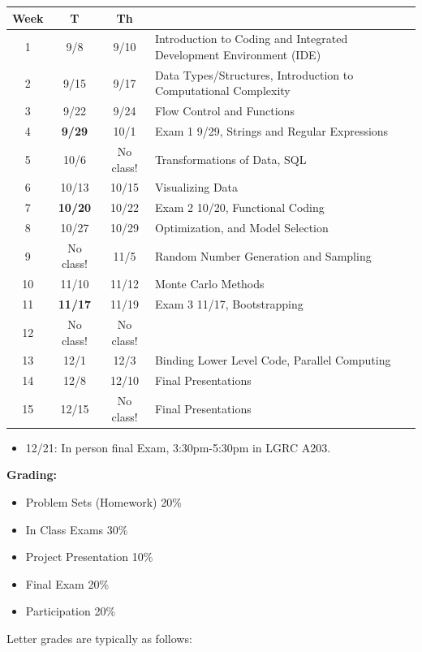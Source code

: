 \documentclass{article}
\begin{document}
\begin{center}
\begin{tabular}{cccl}
Week & T & Th &  \\ \hline
1 &  9/8 & 9/10 &   Introduction to Coding and Integrated Development Environment (IDE) \\
2 & 9/15 & 9/17 &  Data Types/Structures, Introduction to Computational Complexity \\
3 & 9/22 & 9/24 & Flow Control and Functions \\
4 & \textbf{9/29} & 10/1 &  Exam 1 9/29, Strings and Regular Expressions \\
5 & 10/6 & No class! & Transformations of Data, SQL \\
6 & 10/13 & 10/15 &  Visualizing Data \\
7 & \textbf{10/20 }& 10/22 & Exam 2 10/20, Functional Coding \\
8 & 10/27 & 10/29 & Optimization, and Model Selection \\
9 & No class! & 11/5 & Random Number Generation and Sampling \\
10 & 11/10 & 11/12 &  Monte Carlo Methods  \\
11 & \textbf{11/17} & 11/19 & Exam 3 11/17, Bootstrapping \\
12 & No class! & No class! &   \\
13 & 12/1 & 12/3  & Binding Lower Level Code, Parallel Computing \\
14 & 12/8 & 12/10  & Final Presentations \\
15 & 12/15 & No class! & Final Presentations
\end{tabular}
\end{center}

\begin{itemize}
\item 12/21: In person final Exam, 3:30pm-5:30pm in LGRC A203.
\end{itemize}

\noindent \textbf{Grading:} 
\begin{itemize}
\item Problem Sets (Homework) 20\% \vspace{-2mm}
\item In Class Exams 30\% \vspace{-2mm}
\item Project Presentation 10\% \vspace{-2mm}
\item Final Exam 20\% \vspace{-2mm}
\item Participation 20\% 
\end{itemize}
Letter grades are typically as follows:  
\end{document}
